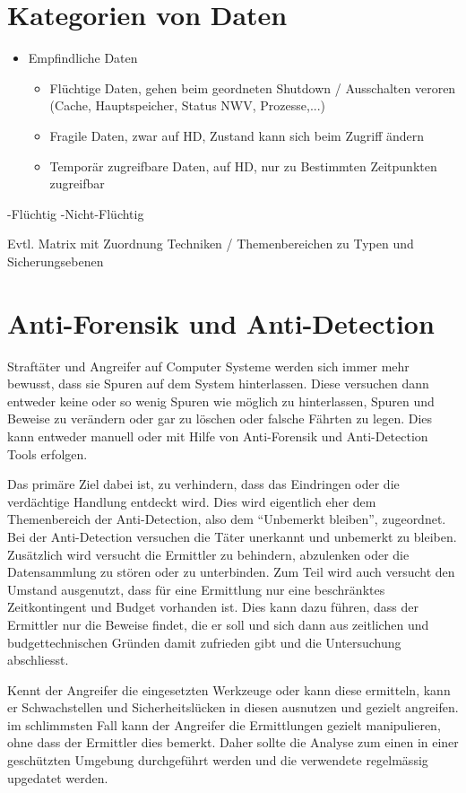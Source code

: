 \section{Kategorien von Daten}
\begin{itemize}
\item Empfindliche Daten
\begin{itemize}
\item Flüchtige Daten, gehen beim geordneten Shutdown / Ausschalten veroren (Cache, Hauptspeicher, Status NWV, Prozesse,...)
\item Fragile Daten, zwar auf HD, Zustand kann sich beim Zugriff ändern
\item Temporär zugreifbare Daten, auf HD, nur zu Bestimmten Zeitpunkten zugreifbar
\end{itemize}
\end{itemize}
-Flüchtig
-Nicht-Flüchtig

Evtl. Matrix mit Zuordnung Techniken / Themenbereichen zu Typen und Sicherungsebenen 



\section{Anti-Forensik und Anti-Detection}
Straftäter und Angreifer auf Computer Systeme werden sich immer mehr bewusst, dass sie Spuren auf dem System hinterlassen. Diese versuchen dann entweder keine oder so wenig Spuren wie möglich zu hinterlassen, Spuren und Beweise zu verändern oder gar zu löschen oder falsche Fährten zu legen. Dies kann entweder manuell oder mit Hilfe von Anti-Forensik und Anti-Detection Tools erfolgen.

Das primäre Ziel dabei ist, zu verhindern, dass das Eindringen oder die verdächtige Handlung entdeckt wird. Dies wird eigentlich eher dem Themenbereich der Anti-Detection, also dem "`Unbemerkt bleiben"', zugeordnet. Bei der Anti-Detection versuchen die Täter unerkannt und unbemerkt zu bleiben. Zusätzlich wird versucht die Ermittler zu behindern, abzulenken oder die Datensammlung zu stören oder zu unterbinden. Zum Teil wird auch versucht den Umstand ausgenutzt, dass für eine Ermittlung nur eine beschränktes Zeitkontingent und Budget vorhanden ist. Dies kann dazu führen, dass der Ermittler nur die Beweise findet, die er soll und sich dann aus zeitlichen und budgettechnischen Gründen damit zufrieden gibt und die Untersuchung abschliesst.

Kennt der Angreifer die eingesetzten Werkzeuge oder kann diese ermitteln, kann er Schwachstellen und Sicherheitslücken in diesen ausnutzen und gezielt angreifen. im schlimmsten Fall kann der Angreifer die Ermittlungen gezielt manipulieren, ohne dass der Ermittler dies bemerkt. Daher sollte die Analyse zum einen in einer geschützten Umgebung durchgeführt werden und die verwendete regelmässig upgedatet werden.



